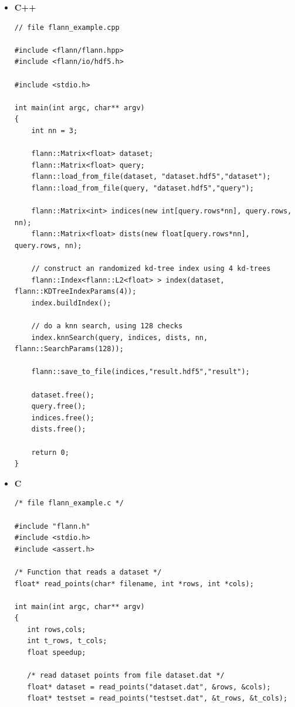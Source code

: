 \documentclass[letter,10pt]{article}
\begin{document}
\begin{itemize}


\item \textbf{C++}
\begin{Verbatim}[fontsize=\scriptsize,frame=single]
// file flann_example.cpp

#include <flann/flann.hpp>
#include <flann/io/hdf5.h>

#include <stdio.h>

int main(int argc, char** argv)
{
    int nn = 3;

    flann::Matrix<float> dataset;
    flann::Matrix<float> query;
    flann::load_from_file(dataset, "dataset.hdf5","dataset");
    flann::load_from_file(query, "dataset.hdf5","query");

    flann::Matrix<int> indices(new int[query.rows*nn], query.rows, nn);
    flann::Matrix<float> dists(new float[query.rows*nn], query.rows, nn);

    // construct an randomized kd-tree index using 4 kd-trees
    flann::Index<flann::L2<float> > index(dataset, flann::KDTreeIndexParams(4));
    index.buildIndex();                                                                                               

    // do a knn search, using 128 checks
    index.knnSearch(query, indices, dists, nn, flann::SearchParams(128));

    flann::save_to_file(indices,"result.hdf5","result");

    dataset.free();
    query.free();
    indices.free();
    dists.free();
    
    return 0;
}

\end{Verbatim}


\item \textbf{C}
\begin{Verbatim}[fontsize=\scriptsize,frame=single]
/* file flann_example.c */

#include "flann.h"
#include <stdio.h>
#include <assert.h>

/* Function that reads a dataset */
float* read_points(char* filename, int *rows, int *cols);

int main(int argc, char** argv)
{
   int rows,cols;
   int t_rows, t_cols;
   float speedup;

   /* read dataset points from file dataset.dat */
   float* dataset = read_points("dataset.dat", &rows, &cols);
   float* testset = read_points("testset.dat", &t_rows, &t_cols);


\end{Verbatim}
\end{itemize}
\end{document}
